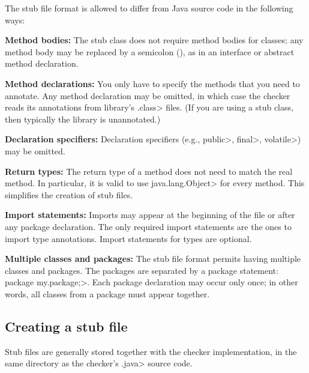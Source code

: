 The stub file format is allowed to differ from Java source code in the
following ways:
\begin{description}

\item{\textbf{Method bodies:}}
  The stub class does not require method bodies for classes; any method
  body may be replaced by a semicolon (\code{;}), as in an interface or
  abstract method declaration.

\item{\textbf{Method declarations:}}
  You only have to specify the methods that you need to annotate.
  Any method declaration may be omitted, in which case the checker reads
  its annotations from library's \<.class> files.  (If you are using a stub class, then
  typically the library is unannotated.)

\item{\textbf{Declaration specifiers:}}
  Declaration specifiers (e.g., \<public>, \<final>, \<volatile>)
  may be omitted.

\item{\textbf{Return types:}}
  The return type of a method does not need to match the real method.
  In particular, it is valid to use \<java.lang.Object> for every method.
  This simplifies the creation of stub files.

\item{\textbf{Import statements:}}
  Imports may appear at the beginning of the file or after any package declaration.
  The only required import statements are the ones to import type
  annotations.  Import statements for types are optional.

\item{\textbf{Multiple classes and packages:}}
  The stub file format permits having multiple classes and packages.
  The packages are separated by a package statement:
  \<package my.package;>.  Each package declaration may occur only once; in
  other words, all classes from a package must appear together.

\end{description}



\subsection{Creating a stub file\label{stub-creating}}

Stub files are generally stored together with the checker implementation,
in the same directory as the checker's \<.java> source code.


